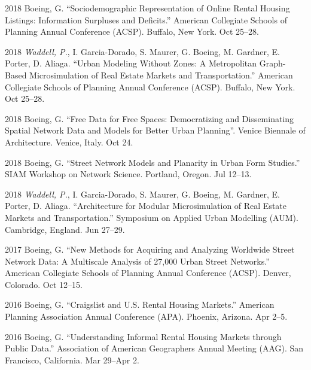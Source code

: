 \documentclass{academiccv}
\begin{document}
\begin{tablist}

\item[2018] \tab Boeing, G. \enquote{Sociodemographic Representation of Online Rental Housing Listings: Information Surpluses and Deficits.} American Collegiate Schools of Planning Annual Conference (ACSP). Buffalo, New York. Oct 25--28.

\item[2018] \tab \textit{Waddell, P.}, I. Garcia-Dorado, S. Maurer, G. Boeing, M. Gardner, E. Porter, D. Aliaga. \enquote{Urban Modeling Without Zones: A Metropolitan Graph-Based Microsimulation of Real Estate Markets and Transportation.} American Collegiate Schools of Planning Annual Conference (ACSP). Buffalo, New York. Oct 25--28.

\item[2018] \tab Boeing, G. \enquote{Free Data for Free Spaces: Democratizing and Disseminating Spatial Network Data and Models for Better Urban Planning}. Venice Biennale of Architecture. Venice, Italy. Oct 24.

\item[2018] \tab Boeing, G. \enquote{Street Network Models and Planarity in Urban Form Studies.} SIAM Workshop on Network Science. Portland, Oregon. Jul 12--13.

\item[2018] \tab \textit{Waddell, P.}, I. Garcia-Dorado, S. Maurer, G. Boeing, M. Gardner, E. Porter, D. Aliaga. \enquote{Architecture for Modular Microsimulation of Real Estate Markets and Transportation.} Symposium on Applied Urban Modelling (AUM). Cambridge, England. Jun 27--29.

\item[2017] \tab Boeing, G. \enquote{New Methods for Acquiring and Analyzing Worldwide Street Network Data: A Multiscale Analysis of 27,000 Urban Street Networks.} American Collegiate Schools of Planning Annual Conference (ACSP). Denver, Colorado. Oct 12--15.

\item[2016] \tab Boeing, G. \enquote{Craigslist and U.S. Rental Housing Markets.} American Planning Association Annual Conference (APA). Phoenix, Arizona. Apr 2--5.

\item[2016] \tab Boeing, G. \enquote{Understanding Informal Rental Housing Markets through Public Data.} Association of American Geographers Annual Meeting (AAG). San Francisco, California. Mar 29--Apr 2.


\end{tablist}
\end{document}
